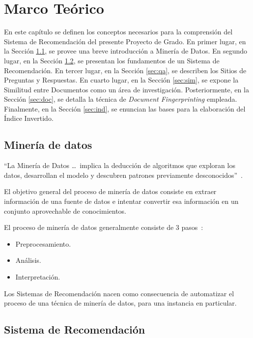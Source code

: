 \chapter{Marco Teórico}

En este capítulo se definen los conceptos necesarios para la comprensión
del Sistema de Recomendación del presente Proyecto de Grado.
En primer lugar, en la Sección \ref{sec:min}, se provee una breve introducción a Minería de Datos.
En segundo lugar, en la Sección \ref{sec:sr}, se presentan los fundamentos de un Sistema de Recomendación.
En tercer lugar, en la Sección \ref{sec:qa}, se describen los Sitios de Preguntas y Respuestas.
En cuarto lugar, en la Sección \ref{sec:sim}, se expone la Similitud entre Documentos como un área de investigación.
Posteriormente, en la Sección \ref{sec:doc}, se detalla la técnica de \textit{Document Fingerprinting} empleada.
Finalmente, en la Sección \ref{sec:ind}, se enuncian las bases para la elaboración del Índice Invertido.

\section{Minería de datos}
\label{sec:min}

“La Minería de Datos \dots~implica la deducción de algoritmos que exploran los datos,
desarrollan el modelo y descubren patrones previamente desconocidos”~\cite{Maimon:2010:DMK:1869923}.

El objetivo general del proceso de minería de datos consiste en extraer
información de una fuente de datos e intentar convertir esa información
en un conjunto aprovechable de conocimientos.

El proceso de minería de datos generalmente consiste de 3 pasos~\cite{Amatriain2011}:

\begin{itemize}
  \item Preprocesamiento.
  \item Análisis.
  \item Interpretación.
\end{itemize}

Los Sistemas de Recomendación nacen como consecuencia de automatizar el
proceso de una técnica de minería de datos, para una instancia en particular.
 
\section{Sistema de Recomendación}
\label{sec:sr}

